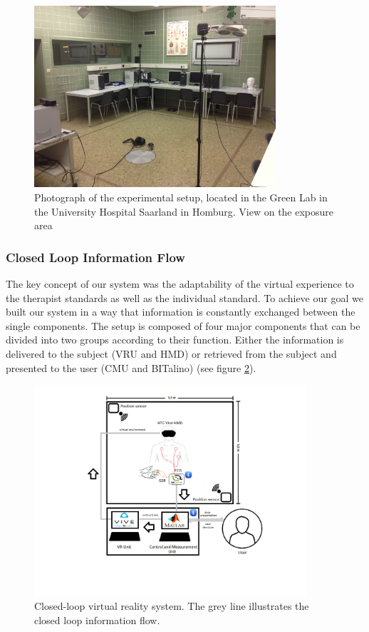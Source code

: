 \begin{figure}[h]
\centering
\includegraphics[width=0.8\textwidth]{images/IMG_5310.JPG}
\caption{Photograph of the experimental setup, located in the Green Lab in the University Hospital Saarland in Homburg. View on the exposure area}
\label{SetupVR2Img}
\end{figure}

\subsubsection{Closed Loop Information Flow}
The key concept of our system was the adaptability of the virtual experience to the therapist standards as well as the individual standard. To achieve our goal we built our system in a way that information is constantly exchanged between the single components.
The setup is composed of four major components that can be divided into two groups according to their function. Either the information is delivered to the subject (VRU and HMD) or retrieved from the subject and presented to the user (CMU and BITalino) (see figure \ref{setupImg}).\\ 

\begin{figure}[ht]
\centering
\includegraphics[width=0.9\textwidth]{images/setup.png}
\caption{Closed-loop virtual reality system. The grey line illustrates the closed loop information flow.}
\label{setupImg}
\end{figure}

